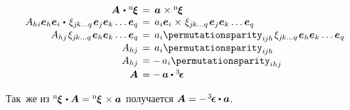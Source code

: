 \nopagebreak\vspace{-0.1em}\begin{equation*}
\begin{array}{r@{\hspace{1ex}}c@{\hspace{1ex}}l}
\bm{A} \hspace{.2ex}\dotp\hspace{.1ex} {^\mathrm{n}\hspace{-0.12ex}\bm{\xi}} & = & \bm{a} \hspace{.1ex} \times {^\mathrm{n}\hspace{-0.12ex}\bm{\xi}}
\\
%
A_{hi} \bm{e}_h \bm{e}_i \hspace{.1ex}\dotp\hspace{.25ex} \xi_{j\hspace{-0.1ex}k \ldots q} \hspace{.2ex} \bm{e}_j \bm{e}_k \ldots \bm{e}_q & = & a_{i} \bm{e}_i \times\hspace{.2ex} \xi_{j\hspace{-0.1ex}k \ldots q} \hspace{.2ex} \bm{e}_j \bm{e}_k \ldots \bm{e}_q
\\[.1em]
%
A_{hj} \hspace{.2ex} \xi_{j\hspace{-0.1ex}k \ldots q} \hspace{.2ex} \bm{e}_h \bm{e}_k \ldots \bm{e}_q & = & a_{i} \permutationsparity_{i\hspace{-0.1ex}jh} \hspace{.2ex} \xi_{j\hspace{-0.1ex}k \ldots q} \hspace{.2ex} \bm{e}_h \bm{e}_k \ldots \bm{e}_q
\\[.1em]
%
A_{hj} & = & a_{i} \permutationsparity_{i\hspace{-0.1ex}jh}
\\[.1em]
%
A_{hj} & = & \! - \, a_{i} \permutationsparity_{ihj}
\\[.2em]
%
\bm{A} & = & \! - \, \bm{a} \dotp \permutationsparitytensor
\end{array}
\end{equation*}

Так~же из ${{^\mathrm{n}\hspace{-0.12ex}\bm{\xi}} \hspace{.2ex} \dotp \bm{A} = {^\mathrm{n}\hspace{-0.12ex}\bm{\xi}} \hspace{.2ex}\times \bm{a}}$ получается ${\bm{A} = - \hspace{.2ex} \permutationsparitytensor \dotp \bm{a}}$.

